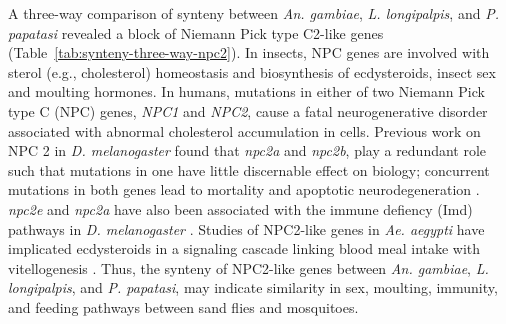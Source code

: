 A three-way comparison of synteny between \emph{An. gambiae}, \emph{L. longipalpis}, and \emph{P. papatasi} revealed a block of Niemann Pick type C2-like genes (Table~\ref{tab:synteny-three-way-npc2}). In insects, NPC genes are involved with sterol (e.g., cholesterol) homeostasis and biosynthesis of ecdysteroids, insect sex and moulting hormones. In humans, mutations in either of two Niemann Pick type C (NPC) genes, \emph{NPC1} and \emph{NPC2}, cause a fatal neurogenerative disorder associated with abnormal cholesterol accumulation in cells.  Previous work on NPC 2 in \emph{D. melanogaster} found that \emph{npc2a} and \emph{npc2b}, play a redundant role such that mutations in one have little discernable effect on biology; concurrent mutations in both genes lead to mortality and apoptotic neurodegeneration \cite{Huang2007}.  \emph{npc2e} and \emph{npc2a} have also been associated with the immune defiency (Imd) pathways in \emph{D. melanogaster} \cite{Shi2012}. Studies of NPC2-like genes in \emph{Ae. aegypti} have implicated ecdysteroids in a signaling cascade linking blood meal intake with vitellogenesis \cite{Sirot2011}.  Thus, the synteny of NPC2-like genes between \emph{An. gambiae}, \emph{L. longipalpis}, and \emph{P. papatasi}, may indicate similarity in sex, moulting, immunity, and feeding pathways between sand flies and mosquitoes.

